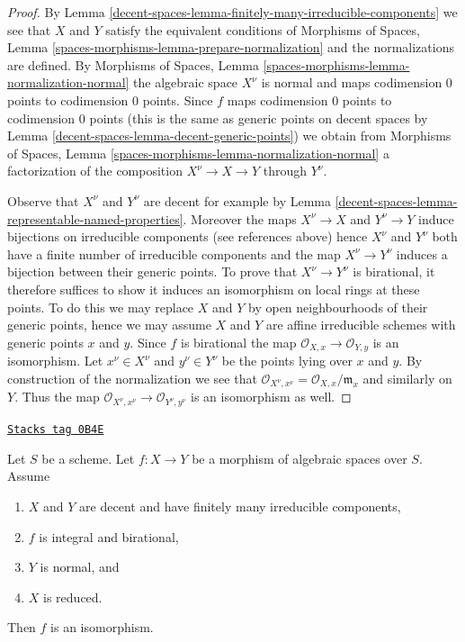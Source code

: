\begin{proof}
By Lemma \ref{decent-spaces-lemma-finitely-many-irreducible-components} we see that
$X$ and $Y$ satisfy the equivalent conditions of
Morphisms of Spaces, Lemma \ref{spaces-morphisms-lemma-prepare-normalization}
and the normalizations are defined. By
Morphisms of Spaces, Lemma \ref{spaces-morphisms-lemma-normalization-normal}
the algebraic space $X^\nu$ is normal and maps codimension $0$ points
to codimension $0$ points. Since $f$ maps codimension $0$ points to
codimension $0$ points (this is the same as generic points on decent
spaces by Lemma \ref{decent-spaces-lemma-decent-generic-points})
we obtain from
Morphisms of Spaces, Lemma \ref{spaces-morphisms-lemma-normalization-normal}
a factorization of the composition $X^\nu \to X \to Y$ through $Y^\nu$.

\medskip\noindent
Observe that $X^\nu$ and $Y^\nu$ are decent for example by
Lemma \ref{decent-spaces-lemma-representable-named-properties}.
Moreover the maps $X^\nu \to X$ and $Y^\nu \to Y$
induce bijections on irreducible components (see references above)
hence $X^\nu$ and $Y^\nu$ both have a finite number of irreducible
components and the map $X^\nu \to Y^\nu$ induces a bijection
between their generic points.
To prove that $X^\nu \to Y^\nu$ is birational, it therefore
suffices to show it induces an isomorphism on local rings at
these points. To do this we may replace $X$ and $Y$ by open neighbourhoods
of their generic points, hence we may assume $X$ and $Y$ are affine
irreducible schemes with generic points $x$ and $y$. Since
$f$ is birational the map $\mathcal{O}_{X, x} \to \mathcal{O}_{Y, y}$
is an isomorphism. Let $x^\nu \in X^\nu$ and $y^\nu \in Y^\nu$ be
the points lying over $x$ and $y$.
By construction of the normalization
we see that $\mathcal{O}_{X^\nu, x^\nu} = \mathcal{O}_{X, x}/\mathfrak m_x$
and similarly on $Y$. Thus the map
$\mathcal{O}_{X^\nu, x^\nu} \to \mathcal{O}_{Y^\nu, y^\nu}$
is an isomorphism as well.
\end{proof}

\begin{lemma}
\label{decent-spaces-lemma-finite-birational-over-normal}
\href{https://stacks.math.columbia.edu/tag/0B4E}{\texttt{Stacks tag 0B4E}}

Let $S$ be a scheme. Let $f : X \to Y$ be a morphism of algebraic
spaces over $S$. Assume
\begin{enumerate}
\item $X$ and $Y$ are decent and have finitely many irreducible components,
\item $f$ is integral and birational,
\item $Y$ is normal, and
\item $X$ is reduced.
\end{enumerate}
Then $f$ is an isomorphism.
\end{lemma}

